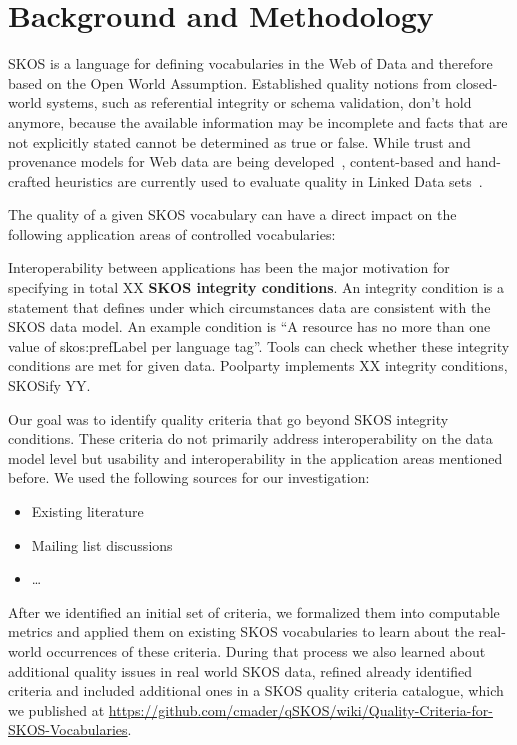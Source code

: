 
\section{Background and Methodology}


SKOS is a language for defining vocabularies in the Web of Data and therefore based on the Open World Assumption. Established quality notions from closed-world systems, such as referential integrity or schema validation, don’t hold anymore, because the available information may be incomplete and facts that are not explicitly stated cannot be determined as true or false. While trust and provenance models for Web data are being developed~\cite{Omitola2011,Hartig2009}, content-based and hand-crafted heuristics are currently used to evaluate quality in Linked Data sets~\cite{Heath2011}.

The quality of a given SKOS vocabulary can have a direct impact on the following application areas of controlled vocabularies: 

Interoperability between applications has been the major motivation for specifying in total XX \textbf{SKOS integrity conditions}. An integrity condition is a statement that defines under which circumstances data are consistent with the SKOS data model. An example condition is ``A resource has no more than one value of skos:prefLabel per language tag''. Tools can check whether these integrity conditions are met for given data. Poolparty implements XX integrity conditions, SKOSify YY. 


Our goal was to identify quality criteria that go beyond SKOS integrity conditions. These criteria do not primarily address interoperability on the data model level but usability and interoperability in the application areas mentioned before. We used the following sources for our investigation:

\begin{itemize}
    \item Existing literature
    \item Mailing list discussions
    \item \ldots
\end{itemize}

After we identified an initial set of criteria, we formalized them into computable metrics and applied them on existing SKOS vocabularies to learn about the real-world occurrences of these criteria. During that process we also learned about additional quality issues in real world SKOS data, refined already identified criteria and included additional ones in a SKOS quality criteria catalogue, which we published at \url{https://github.com/cmader/qSKOS/wiki/Quality-Criteria-for-SKOS-Vocabularies}.




